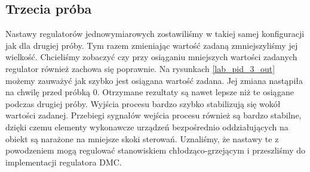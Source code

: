 \subsection{Trzecia próba}
\label{thermal_pid_proba_3}
Nastawy regulatorów jednowymiarowych zostawiliśmy w takiej samej konfiguracji jak dla drugiej próby. Tym razem zmieniając wartość zadaną zmniejszyliśmy jej wielkość. Chcieliśmy zobaczyć czy przy osiąganiu mniejszych wartości zadanych regulator również zachowa się poprawnie. Na rysunkach \ref{lab_pid_3_out} możemy zauważyć jak szybko jest osiągana wartość zadana. Jej zmiana nastąpiła na chwilę przed próbką $0$. Otrzymane rezultaty są nawet lepsze niż te osiągane podczas drugiej próby. Wyjścia procesu bardzo szybko stabilizują się wokół wartości zadanej. Przebiegi sygnałów wejścia procesu również są bardzo stabilne, dzięki czemu elementy wykonawcze urządzeń bezpośrednio oddziałujących na obiekt są narażone na mniejsze skoki sterowań. Uznaliśmy, że nastawy te z powodzeniem mogą regulować stanowiskiem chłodząco-grzejącym i przeszliśmy do implementacji regulatora DMC.


